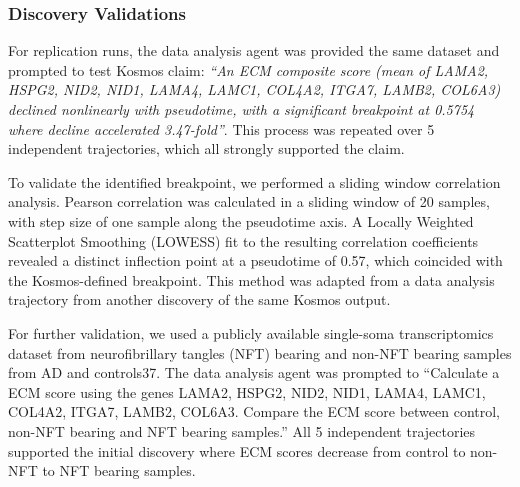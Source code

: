 \documentclass{article}
\begin{document}
\subsubsection{Discovery Validations}

For replication runs, the data analysis agent was provided the same dataset and prompted to test Kosmos claim: \textit{“An ECM composite score (mean of LAMA2, HSPG2, NID2, NID1, LAMA4, LAMC1, COL4A2, ITGA7, LAMB2, COL6A3) declined nonlinearly with pseudotime, with a significant breakpoint at 0.5754 where decline accelerated 3.47-fold”}. This process was repeated over 5 independent trajectories, which all strongly supported the claim.

To validate the identified breakpoint, we performed a sliding window correlation analysis. Pearson correlation was calculated in a sliding window of 20 samples, with step size of one sample along the pseudotime axis. A Locally Weighted Scatterplot Smoothing (LOWESS) fit to the resulting correlation coefficients revealed a distinct inflection point at a pseudotime of 0.57, which coincided with the Kosmos-defined breakpoint. This method was adapted from a data analysis trajectory from another discovery of the same Kosmos output.

For further validation, we used a publicly available single-soma transcriptomics dataset from neurofibrillary tangles (NFT) bearing and non-NFT bearing samples from AD and controls37. The data analysis agent was prompted to “Calculate a ECM score using the genes LAMA2, HSPG2, NID2, NID1, LAMA4, LAMC1, COL4A2, ITGA7, LAMB2, COL6A3. Compare the ECM score between control, non-NFT bearing and NFT bearing samples.” All 5 independent trajectories supported the initial discovery where ECM scores decrease from control to non-NFT to NFT bearing samples.
\end{document}
